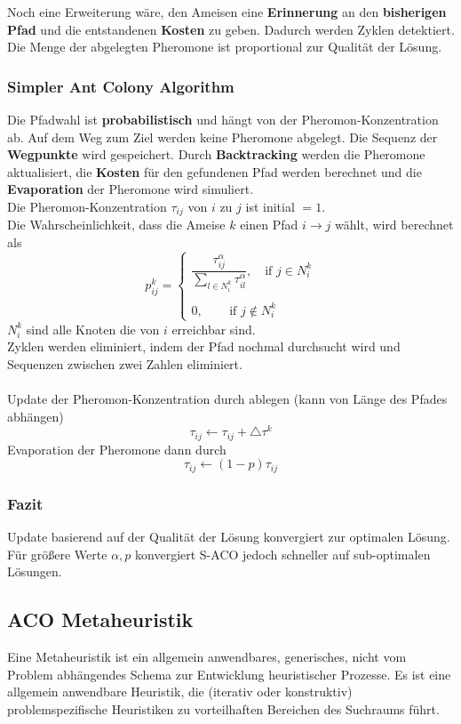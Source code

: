 \documentclass[a4paper]{article}
\begin{document}
Noch eine Erweiterung wäre, den Ameisen eine \textbf{Erinnerung} an den\textbf{ bisherigen Pfad} und die entstandenen \textbf{Kosten} zu geben. Dadurch werden Zyklen detektiert. Die Menge der abgelegten Pheromone ist proportional zur Qualität der Lösung.

\subsubsection{Simpler Ant Colony Algorithm}
Die Pfadwahl ist \textbf{probabilistisch} und hängt von der Pheromon-Konzentration ab. Auf dem Weg zum Ziel werden keine Pheromone abgelegt. Die Sequenz der \textbf{Wegpunkte} wird gespeichert. Durch \textbf{Backtracking} werden die Pheromone aktualisiert, die \textbf{Kosten} für den gefundenen Pfad werden berechnet und die \textbf{Evaporation} der Pheromone wird simuliert.\\

Die Pheromon-Konzentration $\tau_{ij}$ von $i$ zu $j$ ist initial $= 1$.\\
Die Wahrscheinlichkeit, dass die Ameise $k$ einen Pfad $i\rightarrow j$ wählt, wird berechnet als
$$p_{ij}^k = \left\{
\begin{matrix}
\dfrac{\tau_{ij}^\alpha}{\sum_{l \in N_i^k}\tau_{il}^\alpha}, \ \ \ \text{ if } j \in N_i^k\\\\
0, \ \ \ \ \ \ \ \ \text{ if } j\notin N_i^k
\end{matrix}
\right.$$
$N_i^k$ sind alle Knoten die von $i$ erreichbar sind.\\

Zyklen werden eliminiert, indem der Pfad nochmal durchsucht wird und Sequenzen zwischen zwei Zahlen eliminiert.\\
\\
Update der Pheromon-Konzentration durch ablegen (kann von Länge des Pfades abhängen)
$$\tau_{ij} \leftarrow \tau_{ij}+\triangle\tau^k$$ 
Evaporation der Pheromone dann durch
$$\tau_{ij} \leftarrow (1-p)\tau_{ij}$$ 

\subsubsection{Fazit}
Update basierend auf der Qualität der Lösung konvergiert zur optimalen Lösung. Für größere Werte $\alpha,p$ konvergiert S-ACO jedoch schneller auf sub-optimalen Lösungen.

 
\subsection{ACO Metaheuristik}
Eine Metaheuristik ist ein allgemein anwendbares, generisches, nicht vom Problem abhängendes Schema zur Entwicklung heuristischer Prozesse. Es ist eine allgemein anwendbare Heuristik, die (iterativ oder konstruktiv) problemspezifische Heuristiken zu vorteilhaften Bereichen des Suchraums führt.\\
\end{document}
